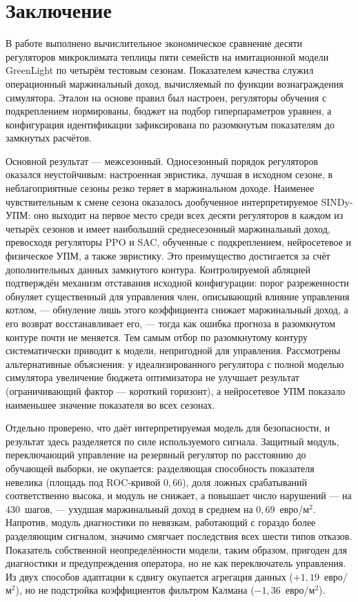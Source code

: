 \documentclass[12pt,a4paper,leqno]{article}
\begin{document}
\section{Заключение}
\label{sec:conclusion}

В работе выполнено вычислительное экономическое сравнение десяти регуляторов
микроклимата теплицы пяти семейств на имитационной модели GreenLight по четырём тестовым
сезонам. Показателем качества служил операционный маржинальный доход, вычисляемый по функции
вознаграждения симулятора. Эталон на основе правил был настроен, регуляторы обучения с
подкреплением нормированы, бюджет на подбор гиперпараметров уравнен, а конфигурация
идентификации зафиксирована по разомкнутым показателям до замкнутых расчётов.

Основной результат — межсезонный. Односезонный порядок регуляторов оказался
неустойчивым: настроенная эвристика, лучшая в исходном сезоне, в неблагоприятные сезоны
резко теряет в маржинальном доходе. Наименее
чувствительным к смене сезона оказалось дообученное интерпретируемое SINDy-УПМ: оно выходит
на первое место среди всех десяти регуляторов в каждом из четырёх сезонов и имеет
наибольший среднесезонный маржинальный доход, превосходя регуляторы PPO и SAC, обученные с подкреплением, нейросетевое и
физическое УПМ, а также эвристику. Это преимущество достигается за счёт дополнительных
данных замкнутого контура. Контролируемой абляцией подтверждён механизм отставания
исходной конфигурации: порог разреженности обнуляет существенный для управления член,
описывающий влияние управления котлом, — обнуление лишь этого коэффициента снижает маржинальный доход, а его возврат
восстанавливает его, — тогда как ошибка прогноза в разомкнутом контуре почти не меняется.
Тем самым отбор по разомкнутому контуру систематически приводит к модели, непригодной
для управления. Рассмотрены альтернативные объяснения: у идеализированного регулятора с
полной моделью симулятора увеличение бюджета оптимизатора не улучшает результат (ограничивающий фактор —
короткий горизонт), а нейросетевое УПМ показало наименьшее значение показателя во всех сезонах.

Отдельно проверено, что даёт интерпретируемая модель для безопасности, и результат здесь
разделяется по силе используемого сигнала. Защитный модуль, переключающий управление на
резервный регулятор по расстоянию до обучающей выборки, не окупается: разделяющая
способность показателя невелика (площадь под ROC-кривой $0{,}66$), доля ложных
срабатываний соответственно высока, и модуль не снижает, а повышает число нарушений — на
$430$~шагов, — ухудшая маржинальный доход в среднем на $0{,}69$~евро/м$^2$. Напротив,
модуль диагностики по невязкам, работающий с гораздо более разделяющим сигналом, значимо
смягчает последствия всех шести типов отказов. Показатель собственной неопределённости
модели, таким образом, пригоден для диагностики и предупреждения оператора, но не как
переключатель управления. Из двух способов адаптации к сдвигу окупается агрегация данных
($+1{,}19$~евро/м$^2$), но не подстройка коэффициентов фильтром Калмана
($-1{,}36$~евро/м$^2$).
\end{document}
